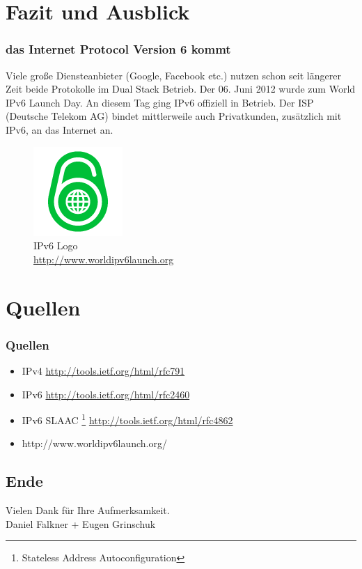 \documentclass[xcolor=dvipsnames]{beamer}
\newcommand*{\Author}{Daniel Falkner + Eugen Grinschuk} %
\begin{document}
\section{Fazit und Ausblick}
\begin{frame}
 \frametitle{das Internet Protocol Version 6 kommt}
	Viele große Diensteanbieter (Google, Facebook etc.) nutzen schon seit längerer Zeit beide Protokolle im Dual Stack Betrieb. Der 06. Juni 2012 wurde zum World IPv6 Launch Day. An diesem Tag ging IPv6 offiziell in Betrieb. Der ISP (Deutsche Telekom AG) bindet mittlerweile auch Privatkunden, zusätzlich mit IPv6, an das Internet an.
	\begin{figure}
	\includegraphics[scale=0.4]{World_IPv6_launch_logo_128.png}
			\caption{IPv6 Logo \\ \tiny{\textcolor{gray}{\url{http://www.worldipv6launch.org}}}}
	\end{figure} 
\end{frame}

\section{Quellen}
\begin{frame}
 \frametitle{Quellen}
  \begin{block}{}
	  \begin{itemize}
  		\item IPv4 \url{http://tools.ietf.org/html/rfc791}
  		\item IPv6 \url{http://tools.ietf.org/html/rfc2460}
  		\item IPv6 SLAAC \footnote{Stateless Address Autoconfiguration} \url{http://tools.ietf.org/html/rfc4862}
  		\item http://www.worldipv6launch.org/
	  \end{itemize}
  \end{block}
\end{frame}

\subsection*{Ende}
\begin{frame}
	\begin{block}{}	
		\begin{center}
			Vielen Dank für Ihre Aufmerksamkeit. \\
			\Author{}
		\end{center}	
	\end{block}
\end{frame}
\end{document}
